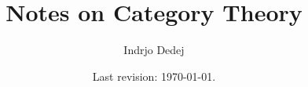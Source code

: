 



\title{Notes on Category Theory}
\author{Indrjo Dedej}
\date{Last revision: \today{}.}





\cleardoublepage


\tableofcontents
\restoregeometry








\printbibliography



